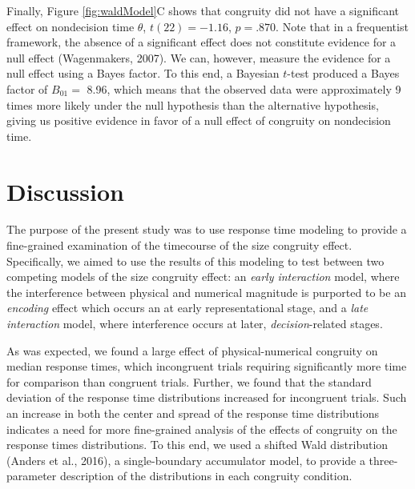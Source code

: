 \documentclass[english,,man]{apa6}
\theoremstyle{definition}
\theoremstyle{definition}
\theoremstyle{definition}
\theoremstyle{remark}
\begin{document}
Finally, Figure \ref{fig:waldModel}C shows that congruity did not have a
significant effect on nondecision time \(\theta\), \(t(22) = -1.16\),
\(p = .870\). Note that in a frequentist framework, the absence of a
significant effect does not constitute evidence for a null effect
(Wagenmakers, 2007). We can, however, measure the evidence for a null
effect using a Bayes factor. To this end, a Bayesian \(t\)-test produced
a Bayes factor of \(B_{01}=\) 8.96, which means that the observed data
were approximately 9 times more likely under the null hypothesis than
the alternative hypothesis, giving us positive evidence in favor of a
null effect of congruity on nondecision time.

\hypertarget{discussion}{%
\section{Discussion}\label{discussion}}

The purpose of the present study was to use response time modeling to
provide a fine-grained examination of the timecourse of the size
congruity effect. Specifically, we aimed to use the results of this
modeling to test between two competing models of the size congruity
effect: an \emph{early interaction} model, where the interference
between physical and numerical magnitude is purported to be an
\emph{encoding} effect which occurs an at early representational stage,
and a \emph{late interaction} model, where interference occurs at later,
\emph{decision}-related stages.

As was expected, we found a large effect of physical-numerical congruity
on median response times, which incongruent trials requiring
significantly more time for comparison than congruent trials. Further,
we found that the standard deviation of the response time distributions
increased for incongruent trials. Such an increase in both the center
and spread of the response time distributions indicates a need for more
fine-grained analysis of the effects of congruity on the response times
distributions. To this end, we used a shifted Wald distribution (Anders
et al., 2016), a single-boundary accumulator model, to provide a
three-parameter description of the distributions in each congruity
condition.
\end{document}

